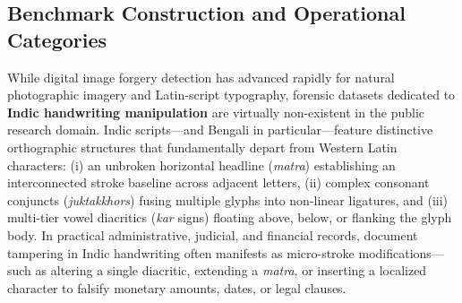 \documentclass[runningheads]{llncs}
\begin{document}
\subsection{Benchmark Construction and Operational Categories}\label{subsec3_1}
While digital image forgery detection has advanced rapidly for natural photographic imagery and Latin-script typography, forensic datasets dedicated to \textbf{Indic handwriting manipulation} are virtually non-existent in the public research domain. Indic scripts---and Bengali in particular---feature distinctive orthographic structures that fundamentally depart from Western Latin characters: (i) an unbroken horizontal headline (\textit{matra}) establishing an interconnected stroke baseline across adjacent letters, (ii) complex consonant conjuncts (\textit{juktakkhors}) fusing multiple glyphs into non-linear ligatures, and (iii) multi-tier vowel diacritics (\textit{kar} signs) floating above, below, or flanking the glyph body. In practical administrative, judicial, and financial records, document tampering in Indic handwriting often manifests as micro-stroke modifications---such as altering a single diacritic, extending a \textit{matra}, or inserting a localized character to falsify monetary amounts, dates, or legal clauses.
\end{document}
